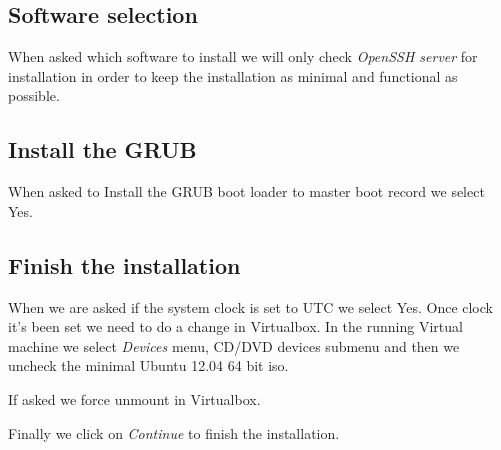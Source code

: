 \subsection {Software selection}
When asked which software to install we will only check \textit{OpenSSH server} for installation in order to keep the installation as minimal and functional as possible.

\subsection {Install the GRUB}
When asked to Install the GRUB boot loader to master boot record we select Yes.

\subsection {Finish the installation}
When we are asked if the system clock is set to UTC we select Yes. Once clock it's been set we need to do a change in Virtualbox. In the running Virtual machine we select \textit{Devices} menu, CD/DVD devices submenu and then we uncheck the minimal Ubuntu 12.04 64 bit iso.

If asked we force unmount in Virtualbox.

Finally we click on \textit{Continue} to finish the installation.
